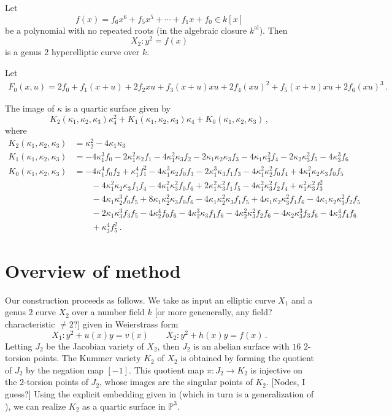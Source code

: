 \documentclass[reqno, 12pt]{amsart}
\theoremstyle{definition}
\renewcommand{\P}{\mathbb P}
\newcommand{\kal}{k^{\mathrm{al}}}
\newcommand{\sss}[1]{{\color{blue} [#1]}}
\begin{document}
Let
$$
f(x) = f_6 x^6 + f_5 x^5 + \cdots + f_1 x + f_0 \in k[x]
$$
be a polynomial with no repeated roots (in the algebraic closure $\kal$). Then
$$
X_2: y^2 = f(x)
$$
is a genus $2$ hyperelliptic curve over $k$.

Let
\begin{align*}
F_0(x,u) = 2 f_0 + f_1(x+u) + 2 f_2 xu + f_3(x+u)xu + 2 f_4(xu)^2 + f_5(x+u)xu + 2 f_6 (xu)^3 \, .
\end{align*}

The image of $\kappa$ is a quartic surface given by
$$
K_2(\kappa_1, \kappa_2, \kappa_3) \kappa_4^2 + K_1(\kappa_1, \kappa_2, \kappa_3) \kappa_4 + K_0(\kappa_1, \kappa_2, \kappa_3) \, ,
$$
where
\begin{align*}
K_2(\kappa_1, \kappa_2, \kappa_3) &= \kappa_2^2 - 4 \kappa_1 \kappa_3\\
K_1(\kappa_1, \kappa_2, \kappa_3) &= -4 \kappa_1^3 f_0 - 2 \kappa_1^2 \kappa_2 f_1 - 4 \kappa_1^2 \kappa_3 f_2 - 2 \kappa_1 \kappa_2 \kappa_3  f_3 - 4 \kappa_1 \kappa_3^2 f_4 -2 \kappa_2 \kappa_3^2 f_5 - 4 \kappa_3^3 f_6\\
K_0(\kappa_1, \kappa_2, \kappa_3) &=
-4 \kappa_1^4 f_0 f_2 + \kappa_1^4 f_1^2 - 4 \kappa_1^3 \kappa_2 f_0 f_3 - 2 \kappa_1^3 \kappa_3 f_1 f_3 - 4 \kappa_1^2 \kappa_2^2 f_0 f_4 + 4 \kappa_1^2 \kappa_2 \kappa_3 f_0 f_5\\
	&\qquad - 4 \kappa_1^2 \kappa_2 \kappa_3 f_1 f_4 - 4 \kappa_1^2 \kappa_3^2 f_0 f_6 + 2 \kappa_1^2 \kappa_3^2 f_1 f_5 -4 \kappa_1^2 \kappa_3^2 f_2 f_4 +   \kappa_1^2 \kappa_3^2 f_3^2\\
	&\qquad - 4 \kappa_1 \kappa_2^3 f_0 f_5 + 8 \kappa_1 \kappa_2^2 \kappa_3 f_0 f_6 - 4 \kappa_1 \kappa_2^2 \kappa_3 f_1 f_5 + 4 \kappa_1 \kappa_2 \kappa_3^2 f_1 f_6 - 4 \kappa_1 \kappa_2 \kappa_3^2 f_2 f_5\\
	&\qquad - 2  \kappa_1 \kappa_3^3 f_3 f_5 - 4 \kappa_2^4 f_0 f_6 - 4 \kappa_2^3 \kappa_3 f_1 f_6 - 4 \kappa_2^2 \kappa_3^2 f_2  f_6 -4 \kappa_2 \kappa_3^3 f_3 f_6 - 4 \kappa_3^4 f_4 f_6\\
	&\qquad + \kappa_3^4 f_5^2 \, .
\end{align*}

\section{Overview of method}

Our construction proceeds as follows. We take as input an elliptic curve $X_1$ and a genus $2$ curve $X_2$ over a number field $k$ \sss{or more genenerally, any field? characteristic $\neq 2$?} given in Weierstrass form
$$
X_1: y^2 + u(x) y = v(x) \qquad
X_2: y^2 + h(x) y = f(x) \, .
$$
Letting $J_2$ be the Jacobian variety of $X_2$, then $J_2$ is an abelian surface with $16$ $2$-torsion points. The Kummer variety $K_2$ of $X_2$ is obtained by forming the quotient of $J_2$ by the negation map $[-1]$. This quotient map $\pi : J_2 \to K_2$ is injective on the $2$-torsion points of $J_2$, whose images are the singular points of $K_2$. \sss{Nodes, I guess?} Using  the explicit embedding given in \cite{Mueller} (which in turn is a generalization of \cite{CasselsFlynn}), we can realize $K_2$ as a quartic surface in $\P^3$.
\end{document}
